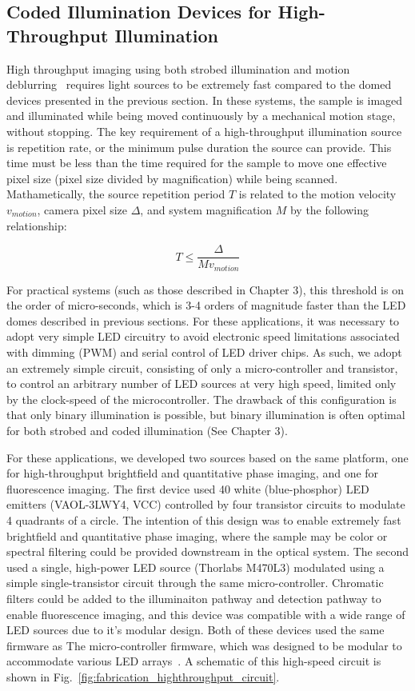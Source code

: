 \subsection{Coded Illumination Devices for High-Throughput Illumination}\label{sec:fabrication:highthroughput}

High throughput imaging using both strobed illumination and motion deblurring~\cite{raskar2006coded} requires light sources to be extremely fast compared to the domed devices presented in the previous section. In these systems, the sample is imaged and illuminated while being moved continuously by a mechanical motion stage, without stopping. The key requirement of a high-throughput illumination source is repetition rate, or the minimum pulse duration the source can provide. This time must be less than the time required for the sample to move one effective pixel size (pixel size divided by magnification) while being scanned. Mathametically, the source repetition period $T$ is related to the motion velocity $v_{motion}$, camera pixel size $\Delta$, and system magnification $M$ by the following relationship:

\begin{equation}
    T \leq \frac{\Delta}{Mv_{motion}}
\end{equation}

For practical systems (such as those described in Chapter 3), this threshold is on the order of micro-seconds, which is 3-4 orders of magnitude faster than the LED domes described in previous sections. For these applications, it was necessary to adopt very simple LED circuitry to avoid electronic speed limitations associated with dimming (PWM) and serial control of LED driver chips. As such, we adopt an extremely simple circuit, consisting of only a micro-controller and transistor, to control an arbitrary number of LED sources at very high speed, limited only by the clock-speed of the microcontroller. The drawback of this configuration is that only binary illumination is possible, but binary illumination is often optimal for both strobed and coded illumination (See Chapter 3).

For these applications, we developed two sources based on the same platform, one for high-throughput brightfield and quantitative phase imaging, and one for fluorescence imaging. The first device used 40 white (blue-phosphor) LED emitters (VAOL-3LWY4, VCC) controlled by four transistor circuits to modulate 4 quadrants of a circle. The intention of this design was to enable extremely fast brightfield and quantitative phase imaging, where the sample may be color or spectral filtering could be provided downstream in the optical system. The second used a single, high-power LED source (Thorlabs M470L3) modulated using a simple single-transistor circuit through the same micro-controller. Chromatic filters could be added to the illuminaiton pathway and detection pathway to enable fluorescence imaging, and this device was compatible with a wide range of LED sources due to it's modular design. Both of these devices used the same firmware as The micro-controller firmware, which was designed to be modular to accommodate various LED arrays~\cite{illuminate}. A schematic of this high-speed circuit is shown in Fig.~\ref{fig:fabrication_highthroughput_circuit}.


